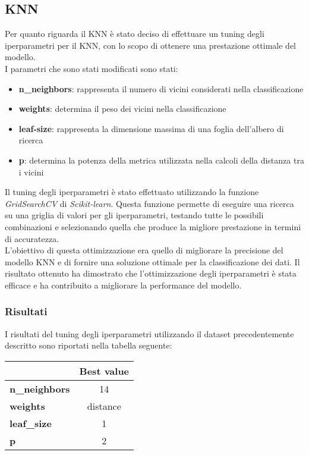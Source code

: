 \documentclass[../../Report.tex]{subfiles}
\begin{document}
\subsection{KNN}
Per quanto riguarda il KNN è stato deciso di effettuare un tuning degli iperparametri per il KNN, con lo scopo di ottenere una prestazione ottimale del modello.\\
I parametri che sono stati modificati sono stati:
\begin{itemize}
    \item \textbf{n\_neighbors}: rappresenta il numero di vicini considerati nella classificazione
    \item \textbf{weights}: determina il peso dei vicini nella classificazione
    \item \textbf{leaf-size}: rappresenta la dimensione massima di una foglia dell'albero di ricerca
    \item \textbf{p}: determina la potenza della metrica utilizzata nella calcoli della distanza tra i vicini
\end{itemize}
Il tuning degli iperparametri è stato effettuato utilizzando la funzione \emph{GridSearchCV} di \emph{Scikit-learn}. Questa funzione permette di eseguire una ricerca su una griglia di valori per gli iperparametri, testando tutte le possibili combinazioni e selezionando quella che produce la migliore prestazione in termini di accuratezza.\\
L'obiettivo di questa ottimizzazione era quello di migliorare la precisione del modello KNN e di fornire una soluzione ottimale per la classificazione dei dati. Il risultato ottenuto ha dimostrato che l'ottimizzazione degli iperparametri è stata efficace e ha contribuito a migliorare la performance del modello.

\subsubsection{Risultati}
I risultati del tuning degli iperparametri utilizzando il dataset precedentemente descritto sono riportati nella tabella seguente:

\begin{table}[H]
    \centering
    \begin{tabular}{|l|c|}
        \hline
         & \textbf{Best value} \\
        \hline
        \textbf{n\_neighbors} & 14 \\
        \hline
        \textbf{weights} & distance \\
        \hline
        \textbf{leaf\_size} & 1 \\
        \hline
        \textbf{p} & 2 \\
        \hline
    \end{tabular}
\end{table}
\end{document}

